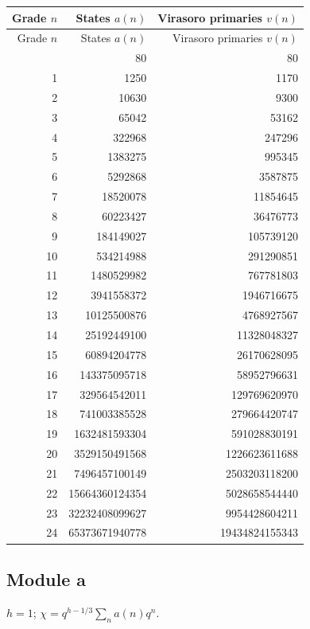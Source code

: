 \begingroup\small
\setlength{\tabcolsep}{5pt}
\begin{longtable}{@{}rrr@{}}
\toprule
Grade $n$ & States $a(n)$ & Virasoro primaries $v(n)$\\
\midrule\endfirsthead
\toprule
Grade $n$ & States $a(n)$ & Virasoro primaries $v(n)$\\
\midrule\endhead
\bottomrule\endfoot
0 & 80 & 80\\
1 & 1250 & 1170\\
2 & 10630 & 9300\\
3 & 65042 & 53162\\
4 & 322968 & 247296\\
5 & 1383275 & 995345\\
6 & 5292868 & 3587875\\
7 & 18520078 & 11854645\\
8 & 60223427 & 36476773\\
9 & 184149027 & 105739120\\
10 & 534214988 & 291290851\\
11 & 1480529982 & 767781803\\
12 & 3941558372 & 1946716675\\
13 & 10125500876 & 4768927567\\
14 & 25192449100 & 11328048327\\
15 & 60894204778 & 26170628095\\
16 & 143375095718 & 58952796631\\
17 & 329564542011 & 129769620970\\
18 & 741003385528 & 279664420747\\
19 & 1632481593304 & 591028830191\\
20 & 3529150491568 & 1226623611688\\
21 & 7496457100149 & 2503203118200\\
22 & 15664360124354 & 5028658544440\\
23 & 32232408099627 & 9954428604211\\
24 & 65373671940778 & 19434824155343\\
\end{longtable}
\endgroup

\subsection{Module a}
$h=1$; $\chi=q^{h-1/3}\sum_n a(n)q^n$.

